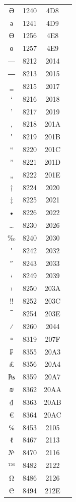 ﻿\documentclass[10pt]{article}
\begin{document}
\begin{tabular}{crcl}
Ә&1240&4D8&\\
ә&1241&4D9&\\
Ө&1256&4E8&\\
ө&1257&4E9&\\
—&8212&2014&\\
―&8213&2015&\\
‗&8215&2017&\\
‘&8216&2018&\\
’&8217&2019&\\
‚&8218&201A&\\
‛&8219&201B&\\
“&8220&201C&\\
”&8221&201D&\\
„&8222&201E&\\
†&8224&2020&\\
‡&8225&2021&\\
•&8226&2022&\\
…&8230&2026&\\
‰&8240&2030&\\
′&8242&2032&\\
″&8243&2033&\\
‹&8249&2039&\\
›&8250&203A&\\
‼&8252&203C&\\
‾&8254&203E&\\
⁄&8260&2044&\\
ⁿ&8319&207F&\\
₣&8355&20A3&\\
₤&8356&20A4&\\
₧&8359&20A7&\\
₪&8362&20AA&\\
₫&8363&20AB&\\
€&8364&20AC&\\
℅&8453&2105&\\
ℓ&8467&2113&\\
№&8470&2116&\\
™&8482&2122&\\
Ω&8486&2126&\\
℮&8494&212E&\\
\end{tabular}
\end{document}
